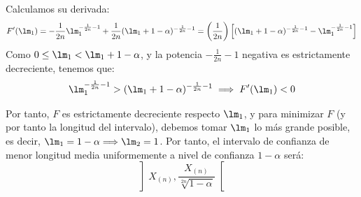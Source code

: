 \begin{ejercicio}
    Calculamos su derivada:
    \begin{equation*}
        F'(\lm_1) = -\frac{1}{2n}\lm_1^{-\frac{1}{2n}-1} + \frac{1}{2n}(\lm_1 + 1 - \alpha)^{-\frac{1}{2n}-1} = \left(\frac{1}{2n}\right)\left[(\lm_1 + 1 - \alpha)^{-\frac{1}{2n}-1} - \lm_1^{-\frac{1}{2n}-1}\right]
    \end{equation*}
    Como $0\leq \lm_1 < \lm_1 + 1 - \alpha$, y la potencia $-\frac{1}{2n}-1$ negativa es estrictamente decreciente, tenemos que:
    \begin{equation*}
        \lm_1^{-\frac{1}{2n}-1} > (\lm_1 + 1 - \alpha)^{-\frac{1}{2n}-1} \implies F'(\lm_1) < 0
    \end{equation*}

    Por tanto, $F$ es estrictamente decreciente respecto $\lm_1$, y para minimizar $F$ (y por tanto la longitud del intervalo), debemos tomar $\lm_1$ lo más grande posible, es decir, $\lm_1 = 1 - \alpha \Longrightarrow \lm_2 = 1$. Por tanto, el intervalo de confianza de menor longitud media uniformemente a nivel de confianza $1-\alpha$ será:
    \begin{equation*}
        \left]X_{(n)},\frac{X_{(n)}}{\sqrt[2n]{1 - \alpha}}\right[
    \end{equation*}
\end{ejercicio}

